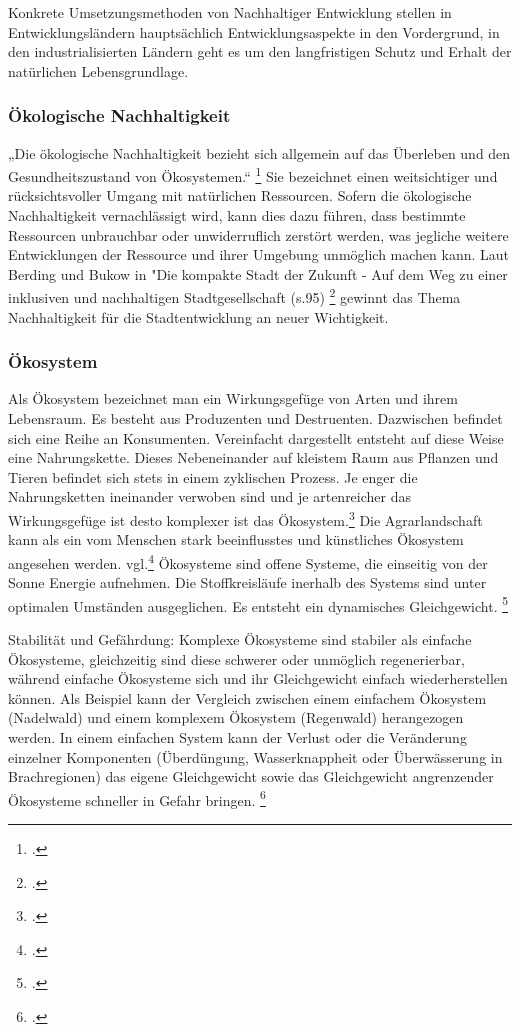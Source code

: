 \documentclass{scrartcl}
\begin{document}
 Konkrete Umsetzungsmethoden von Nachhaltiger Entwicklung stellen in Entwicklungsländern hauptsächlich Entwicklungsaspekte in den Vordergrund, in den industrialisierten Ländern geht es um den langfristigen Schutz und Erhalt der natürlichen Lebensgrundlage. 



\subsubsection{Ökologische Nachhaltigkeit}
„Die ökologische Nachhaltigkeit bezieht sich allgemein auf das Überleben und den Gesundheitszustand von Ökosystemen.“ \footcite{DefinitionWirtschaftslexikonc}  Sie bezeichnet einen weitsichtiger und rücksichtsvoller Umgang mit natürlichen Ressourcen. Sofern die ökologische Nachhaltigkeit vernachlässigt wird, kann dies dazu führen, dass bestimmte Ressourcen unbrauchbar oder unwiderruflich zerstört werden, was jegliche weitere Entwicklungen der Ressource und ihrer Umgebung unmöglich machen kann. Laut Berding und Bukow in "Die kompakte Stadt der Zukunft - Auf dem Weg zu einer inklusiven und nachhaltigen Stadtgesellschaft (s.95) \footcite{BerdingWolf-DietrichBukowKarinCudakHrsgDieStadtgesellschaft} gewinnt das Thema Nachhaltigkeit für die Stadtentwicklung an neuer Wichtigkeit. 



\subsubsection{Ökosystem}
Als Ökosystem bezeichnet man ein Wirkungsgefüge von Arten und ihrem Lebensraum. Es besteht aus Produzenten und Destruenten. Dazwischen befindet sich eine Reihe an Konsumenten. Vereinfacht dargestellt entsteht auf diese Weise eine Nahrungskette. Dieses Nebeneinander auf kleistem Raum aus Pflanzen und Tieren befindet sich stets in einem zyklischen Prozess. Je enger die Nahrungsketten ineinander verwoben sind und je artenreicher das Wirkungsgefüge ist desto komplexer ist das Ökosystem.\footcite{NachhaltigeBrockhaus.de} Die Agrarlandschaft kann als ein vom Menschen stark beeinflusstes und künstliches Ökosystem angesehen werden. vgl.\footcite{BrockhausOkosystem}
Ökosysteme sind offene Systeme, die einseitig von der Sonne Energie aufnehmen. Die Stoffkreisläufe inerhalb des Systems sind unter optimalen Umständen ausgeglichen. Es entsteht ein dynamisches Gleichgewicht. \footcite{BrockhausOkosystem}

\hfill \break
Stabilität und Gefährdung: Komplexe Ökosysteme sind stabiler als einfache Ökosysteme, gleichzeitig sind diese schwerer oder unmöglich regenerierbar, während einfache Ökosysteme sich und ihr Gleichgewicht einfach wiederherstellen können. Als Beispiel kann der Vergleich zwischen einem einfachem Ökosystem (Nadelwald) und einem komplexem Ökosystem (Regenwald) herangezogen werden.
In einem einfachen System kann der Verlust oder die Veränderung einzelner Komponenten (Überdüngung, Wasserknappheit oder Überwässerung in Brachregionen) das eigene Gleichgewicht sowie das Gleichgewicht angrenzender Ökosysteme schneller in Gefahr bringen. \footcite{DefinitionWirtschaftslexikone}
\end{document}
